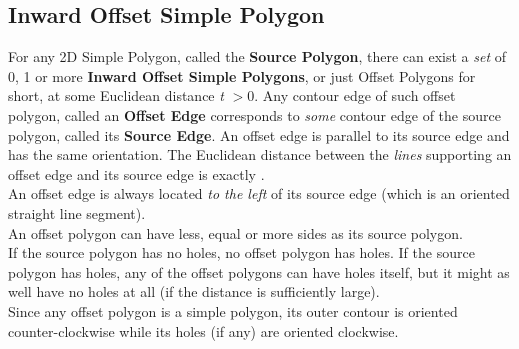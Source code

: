 \subsection{Inward Offset Simple Polygon}

For any 2D Simple Polygon, called the \textbf{Source Polygon}, there can exist a \textit{set} of 0, 1 or more \textbf{Inward Offset Simple Polygons}, or just Offset Polygons for short, at some Euclidean distance \textit{t} $>0$. Any contour edge of such offset polygon, called an \textbf{Offset Edge} corresponds to \textit{some} contour edge of the source polygon, called its \textbf{Source Edge}. An offset edge is parallel to its source edge and has the same orientation. The Euclidean distance between the \textit{lines} supporting an offset edge and its source edge is exactly .\\
An offset edge is always located \textit{to the left} of its source edge (which is an oriented straight line segment).\\
An offset polygon can have less, equal or more sides as its source polygon.\\
If the source polygon has no holes, no offset polygon has holes. If the source polygon has holes, any of the offset polygons can have holes itself, but it might as well have no holes at all (if the distance is sufficiently large).\\
Since any offset polygon is a simple polygon, its outer contour is oriented counter-clockwise while its holes (if any) are oriented clockwise.

